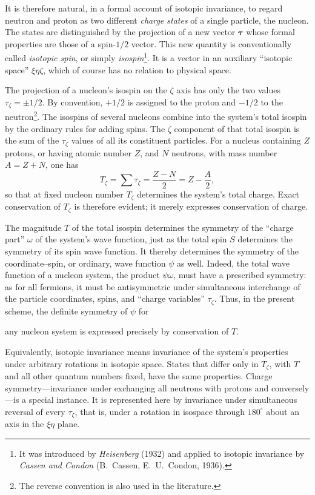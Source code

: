 It is therefore natural, in a formal account of isotopic invariance, to regard neutron and proton as two different \emph{charge states} of a single particle, the nucleon. The states are distinguished by the projection of a new vector $\boldsymbol\tau$ whose formal properties are those of a spin-$1/2$ vector. This new quantity is conventionally called \emph{isotopic spin}, or simply \emph{isospin}\footnote{It was introduced by \emph{Heisenberg} (1932) and applied to isotopic invariance by \emph{Cassen and Condon} (B.~Cassen, E.~U.~Condon, 1936).}. It is a vector in an auxiliary ``isotopic space'' $\xi\eta\zeta$, which of course has no relation to physical space.

The projection of a nucleon's isospin on the $\zeta$ axis has only the two values $\tau_\zeta=\pm1/2$. By convention, $+1/2$ is assigned to the proton and $-1/2$ to the neutron\footnote{The reverse convention is also used in the literature.}. The isospins of several nucleons combine into the system's total isospin by the ordinary rules for adding spins. The $\zeta$ component of that total isospin is the sum of the $\tau_\zeta$ values of all its constituent particles. For a nucleus containing $Z$ protons, or having atomic number $Z$, and $N$ neutrons, with mass number $A=Z+N$, one has
\begin{equation}
 T_\zeta=\sum\tau_\zeta=\frac{Z-N}{2}=Z-\frac A2,
 \tag{116.1}
\end{equation}
so that at fixed nucleon number $T_\zeta$ determines the system's total charge. Exact conservation of $T_\zeta$ is therefore evident; it merely expresses conservation of charge.

The magnitude $T$ of the total isospin determines the symmetry of the ``charge part'' $\omega$ of the system's wave function, just as the total spin $S$ determines the symmetry of its spin wave function. It thereby determines the symmetry of the coordinate--spin, or ordinary, wave function $\psi$ as well. Indeed, the total wave function of a nucleon system, the product $\psi\omega$, must have a prescribed symmetry: as for all fermions, it must be antisymmetric under simultaneous interchange of the particle coordinates, spins, and ``charge variables'' $\tau_\zeta$. Thus, in the present scheme, the definite symmetry of $\psi$ for

any nucleon system is expressed precisely by conservation of $T$.

Equivalently, isotopic invariance means invariance of the system's properties under arbitrary rotations in isotopic space. States that differ only in $T_\zeta$, with $T$ and all other quantum numbers fixed, have the same properties. Charge symmetry---invariance under exchanging all neutrons with protons and conversely---is a special instance. It is represented here by invariance under simultaneous reversal of every $\tau_\zeta$, that is, under a rotation in isospace through $180^\circ$ about an axis in the $\xi\eta$ plane.

